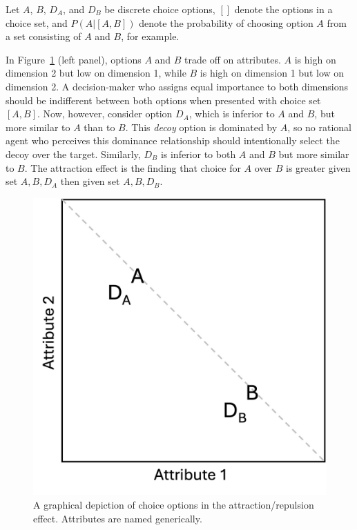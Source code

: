 Let $A$, $B$, $D_{A}$, and $D_{B}$ be discrete choice options, $[]$ denote the options in a choice set, and $P(A|[A,B])$ denote the probability of choosing option $A$ from a set consisting of $A$ and $B$, for example. 

In Figure~\ref{fig:att_stim} (left panel), options $A$ and $B$ trade off on attributes. $A$ is high on dimension 2 but low on dimension 1, while $B$ is high on dimension 1 but low on dimension 2. A decision-maker who assigns equal importance to both dimensions should be indifferent between both options when presented with choice set $[A,B]$. Now, however, consider option $D_{A}$, which is inferior to $A$ and $B$, but more similar to $A$ than to $B$. This \textit{decoy} option is dominated by $A$, so no rational agent who perceives this dominance relationship should intentionally select the decoy over the target. Similarly, $D_{B}$ is inferior to both $A$ and $B$ but more similar to $B$. The attraction effect is the finding that choice for $A$ over $B$ is greater given set ${A,B,D_{A}}$ then given set $A,B,D_{B}$. 


\begin{figure}
   \includegraphics[width=\linewidth]{figures/att_stim.jpg}
   \caption{A graphical depiction of choice options in the attraction/repulsion effect. Attributes are named generically.}
   \label{fig:att_stim}
\end{figure}

